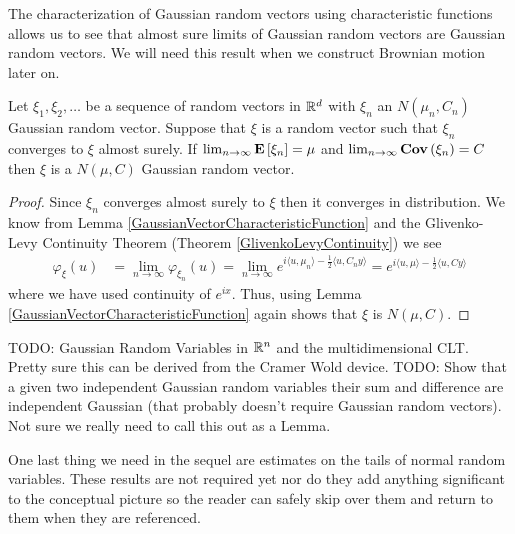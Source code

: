 The characterization of Gaussian random vectors using characteristic
functions allows us to see that almost sure limits of Gaussian random vectors are
Gaussian random vectors.  We will need this result when we construct
Brownian motion later on.
\begin{lem}\label{LimitOfGaussianRandomVectors}Let $\xi_1, \xi_2, \dots$ be a sequence of random
  vectors in $\mathbb{R}^d$ with $\xi_n$ an $N(\mu_n, C_n)$ Gaussian
  random vector.  Suppose that $\xi$ is a random vector such
  that $\xi_n$ converges to $\xi$ almost surely.  If $\lim_{n \to
    \infty} \textbf{E}\left[\xi_n\right] = \mu$ and $\lim_{n \to \infty}
  \textbf{Cov} \left (\xi_n \right ) = C$ then $\xi$ is a $N(\mu, C)$ Gaussian random vector.
\end{lem}
\begin{proof}
Since $\xi_n$ converges almost surely to $\xi$ then it converges in
distribution.  We know from Lemma
\ref{GaussianVectorCharacteristicFunction} and the Glivenko-Levy
Continuity Theorem (Theorem \ref{GlivenkoLevyContinuity}) we see
\begin{align*}
\varphi_\xi(u) &= \lim_{n \to \infty} \varphi_{\xi_n}(u) = \lim_{n \to
  \infty} e^{i\langle u, \mu_n\rangle - \frac{1}{2}\langle u, C_n
  y\rangle} = e^{i\langle u, \mu\rangle - \frac{1}{2}\langle u, C
  y\rangle} 
\end{align*}
where we have used continuity of $e^{ix}$.  Thus, using Lemma
\ref{GaussianVectorCharacteristicFunction}
again shows that $\xi$ is $N(\mu, C)$.
\end{proof}

TODO: Gaussian Random Variables in $\mathbb{R}^n$ and the multidimensional
CLT.  Pretty sure this can be derived from the Cramer Wold device.
TODO: Show that a
given two independent Gaussian random variables their sum and
difference are independent Gaussian (that probably doesn't require
Gaussian random vectors).  Not sure we really need to call this out as a Lemma.

One last thing we need in the sequel are estimates on the tails of
normal random variables.  These results are not required yet nor do
they add anything significant to the conceptual picture so the
reader can safely skip over them and return to them when they are
referenced.

